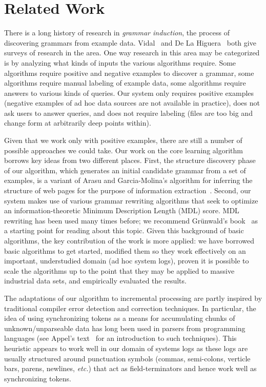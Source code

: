 \section{Related Work}
\label{sec:related}

There is a long history of research in {\em grammar induction},
the process of discovering grammars from example data.  
Vidal~\cite{vidal:gisurvey} and
De La Higuera~\cite{higuera01current} both give surveys
of research in the area.  One way  research in this area
may be categorized is by analyzing what kinds of inputs
the various algorithms require.  Some algorithms
require positive and negative examples to discover a grammar, some
algorithms require manual labeling of example data, some algorithms
require answers to various kinds of queries.  Our system only
requires positive examples (negative examples of ad hoc data sources 
are not available in practice), does not ask users to answer queries,
and does not require labeling (files are too
big and change form at arbitrarily deep points within).  

Given that we work only with positive examples, there
are still a number of possible approaches we could take.
Our work on the core learning algorithm
borrows key ideas from two different places.
First, the structure discovery phase of our algorithm, which
generates an initial candidate grammar from a set of examples,
is a variant of Arasu and Garcia-Molina's algorithm 
for inferring the structure of web pages for the purpose
of information extraction~\cite{arasu+:sigmod03}.
Second, our system makes use of various grammar
rewriting algorithms that seek to optimize an information-theoretic
Minimum Description Length (MDL) score.  MDL rewriting has been
used many times before; we recommend Gr\"{u}nwald's book~\cite{mdlbook}
as a starting point for reading about this topic.
Given this background of basic algorithms, the key contribution
of the work is more applied:  we have borrowed basic algorithms to get
started, modified them so they work effectively on an important,
understudied domain (ad hoc system logs),
proven it is possible to scale the algorithms up
to the point that they may be applied to massive industrial data
sets, and empirically evaluated the results.

The adaptations of our algorithm to incremental processing 
are partly
inspired by traditional compiler error detection and correction
techniques.  In particular, the idea of using synchronizing tokens
as a means for accumulating chunks of unknown/unparseable data
has long been used in parsers from programming languages
(see Appel's text~\cite{appel:modern-compiler} for an
introduction to such techniques).  This heuristic appears to
work well in our domain of systems logs as these logs are
usually structured around punctuation symbols (commas, semi-colons,
verticle bars, parens, newlines, {\em etc.}) that act as
field-terminators and hence work well as synchronizing tokens.

